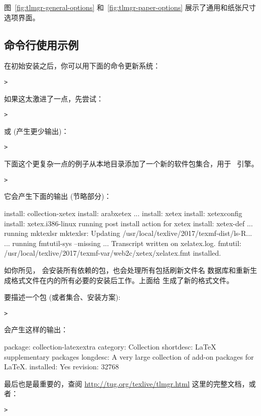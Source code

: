 \documentclass{article}
\begin{document}
图~\ref{fig:tlmgr-general-options} 和~\ref{fig:tlmgr-paper-options}
展示了通用和纸张尺寸选项界面。

\subsection{ 命令行使用示例}

在初始安装之后，你可以用下面的命令更新系统：
\begin{alltt}
> 
\end{alltt}
如果这太激进了一点，先尝试：
\begin{alltt}
> 
\end{alltt}
或 (产生更少输出)：
\begin{alltt}
> 
\end{alltt}

下面这个更复杂一点的例子从本地目录添加了一个新的软件包集合，用于 \XeTeX\ 引擎。

\begin{alltt}
> 
\end{alltt}
它会产生下面的输出 (节略部分)：
\begin{fverbatim}
install: collection-xetex
install: arabxetex
...
install: xetex
install: xetexconfig
install: xetex.i386-linux
running post install action for xetex
install: xetex-def
...
running mktexlsr
mktexlsr: Updating /usr/local/texlive/2017/texmf-dist/ls-R...
...
running fmtutil-sys --missing
...
Transcript written on xelatex.log.
fmtutil: /usr/local/texlive/2017/texmf-var/web2c/xetex/xelatex.fmt installed.
\end{fverbatim}

如你所见， 会安装所有依赖的包，也会处理所有包括刷新文件名
数据库和重新生成格式文件在内的所有必要的安装后工作。上面给 \XeTeX{}
生成了新的格式文件。

要描述一个包 (或者集合、安装方案):
\begin{alltt}
> 
\end{alltt}
会产生这样的输出：
\begin{fverbatim}
package:    collection-latexextra
category:   Collection
shortdesc:  LaTeX supplementary packages
longdesc:   A very large collection of add-on packages for LaTeX.
installed:  Yes
revision:   32768
\end{fverbatim}

最后也是最重要的，查阅 \url{http://tug.org/texlive/tlmgr.html}
这里的完整文档，或者：
\begin{alltt}
> 
\end{alltt}
\end{document}
